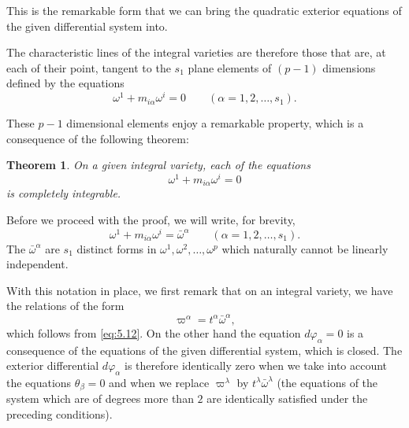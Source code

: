 \documentclass[leqno,11pt]{book}
\numberwithin{equation}{chapter}
\theoremstyle{shape1}
\newtheorem*{thm*}{\hspace{15pt}Theorem}
\theoremstyle{shape0}
\theoremstyle{shape2}
\theoremstyle{definition}
\begin{document}
This is the remarkable form that we can bring the quadratic exterior equations of the given differential system into.

\vspace{12pt}\fsec The characteristic lines of the integral varieties are therefore those that are, at each of their point, tangent to the $s_{1}$ plane elements of $(p-1)$ dimensions defined by the equations
\[
\omega^{1}+m_{i\alpha}\omega^{i}=0\qquad(\alpha=1,2,\dots,s_{1}).
\]

These $p-1$ dimensional elements enjoy a remarkable property, which is a consequence of the following theorem:
\begin{thm*}
  On a given integral variety, each of the equations
\[
\omega^{1}+m_{i\alpha}\omega^{i}=0
\]
is completely integrable.
\end{thm*}

Before we proceed with the proof, we will write, for brevity,
\begin{equation}
  \label{eq:5.13}
  \omega^{1}+m_{i\alpha}\omega^{i}=\bar\omega^{\alpha}\qquad(\alpha=1,2,\dots,s_{1}).
\end{equation}
The $\bar\omega^{\alpha}$ are $s_{1}$ distinct forms in $\omega^{1},\omega^{2},\dots,\omega^{p}$ which naturally cannot be linearly independent.

With this notation in place, we first remark that on an integral variety, we have the relations of the form
\begin{equation}
  \label{eq:5.14}
  \varpi^{\alpha}=t^{\alpha}\bar\omega^{\alpha},
\end{equation}
which follows from \eqref{eq:5.12}. On the other hand the equation $d\varphi_{\alpha}=0$ is a consequence of the equations of the given differential system, which is closed. The exterior differential $d\varphi_{\alpha}$ is therefore identically zero when we take into account the equations $\theta_{\beta}=0$ and when we replace $\varpi^{\lambda}$ by $t^{\lambda}\bar\omega^{\lambda}$ (the equations of the system which are of degrees more than $2$ are identically satisfied under the preceding conditions).
\end{document}
